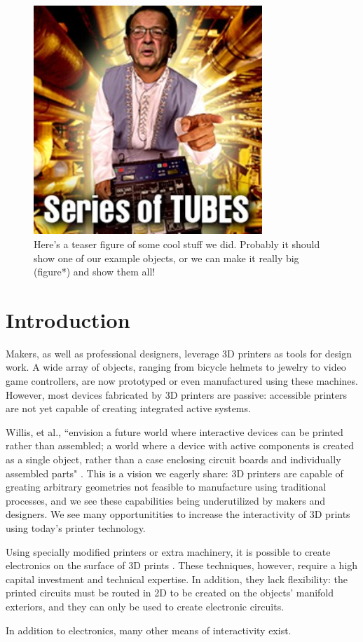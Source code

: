 \begin{figure}[h]
\centering
    \includegraphics[width=3.4in]{figures/series-of-tubes.jpg}
\caption{Here's a teaser figure of some cool stuff we did. Probably it should show one of our example objects, or we can make it really big (figure*) and show them all!}
\label{fig:teaser}
\end{figure}

\section{Introduction}
Makers, as well as professional designers, leverage 3D printers as tools for design work.  A wide array of objects, ranging from bicycle helmets to jewelry to video game controllers, are now prototyped or even manufactured using these machines.  However, most devices fabricated by 3D printers are passive: accessible printers are not yet capable of creating integrated active systems.

Willis, et al., ``envision a future world where interactive devices can be printed rather than assembled; a world where a device with active components is created as a single object, rather than a case enclosing circuit boards and individually assembled parts" \cite{Willis-printedoptics}.  This is a vision we eagerly share: 3D printers are capable of greating arbitrary geometries not feasible to manufacture using traditional processes, and we see these capabilities being underutilized by makers and designers.  We see many opportunitities to increase the interactivity of 3D prints using today's printer technology.

Using specially modified printers or extra machinery, it is possible to create electronics on the surface of 3D prints \cite{optomec} \cite{Sells-reprap}.  These techniques, however, require a high capital investment and technical expertise.  In addition, they lack flexibility: the printed circuits must be routed in 2D to be created on the objects' manifold exteriors, and they can only be used to create electronic circuits. 

In addition to electronics, many other means of interactivity exist.

